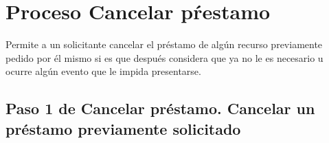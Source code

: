\chapter{Proceso Cancelar pŕestamo}
	Permite a un solicitante cancelar el préstamo de
  algún recurso previamente pedido por él mismo si es que después considera que ya no le es necesario
  u ocurre algún evento que le impida presentarse.


\section{Paso 1 de Cancelar préstamo.
	Cancelar un préstamo previamente solicitado}
	
	
